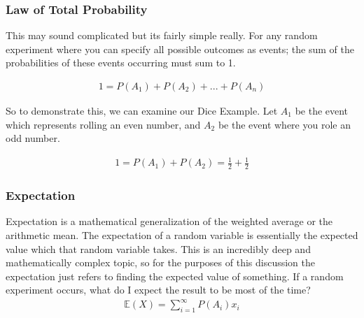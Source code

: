 \documentclass{article}
\begin{document}
\subsubsection{Law of Total Probability}

This may sound complicated but its fairly simple really. For any random experiment where you can specify all possible outcomes as events; the sum of the probabilities of these events occurring must sum to 1.

\begin{align*}
1 = P(A_1) + P(A_2) + ... + P(A_n)
\end{align*}

So to demonstrate this, we can examine our Dice Example. Let $A_1$ be the event which represents rolling an even number, and $A_2$ be the event where you role an odd number.

\begin{align*}
1 = P(A_1) + P(A_2) = \tfrac{1}{2} + \tfrac{1}{2}
\end{align*}

\subsubsection{Expectation}
Expectation is a mathematical generalization of the weighted average or the arithmetic mean. The expectation of a random variable is essentially the expected value which that random variable takes. This is an incredibly deep and mathematically complex topic, so for the purposes of this discussion the expectation just refers to finding the expected value of something. If a random experiment occurs, what do I expect the result to be most of the time?
\begin{align*}
\mathbb{E}(X) = \sum_{i=1}^{\infty} P(A_i) x_i
\end{align*}
\end{document}
